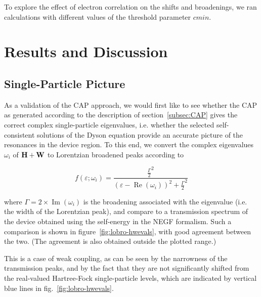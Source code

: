 To explore the effect of electron correlation on the shifts and broadenings, we
ran calculations with different values of the threshold parameter $cmin$.

\section{Results and Discussion}
\label{sec:results}

\subsection{Single-Particle Picture}
\label{subsec:SingleParticle}

As a validation of the \ac{CAP} approach, we would first like to see whether
the \ac{CAP} as generated according to the description of
section~\ref{subsec:CAP} gives the correct complex single-particle eigenvalues,
i.e. whether the selected self-consistent solutions of the Dyson equation
provide an accurate picture of the resonances in the device region. To this
end, we convert the complex eigenvalues $\omega_i$ of $\mathbf{H} + \mathbf{W}$ to
Lorentzian broadened peaks according to

\begin{equation}
	f(\varepsilon;\omega_i)
	= \frac{\frac{\Gamma}{2}^2}
	       {(\varepsilon - \operatorname{Re}(\omega_i))^2
	       + \frac{\Gamma}{2}^2}
	\label{eq:lobro}
\end{equation}

where $\Gamma = 2 \times \operatorname{Im}(\omega_i)$ is the broadening
associated with the eigenvalue (i.e. the width of the Lorentzian peak), and
compare to a transmission spectrum of the device obtained using the self-energy
in the \ac{NEGF} formalism. Such a comparison is shown in
figure~\ref{fig:lobro-hwevals}, with good agreement between the two. (The
agreement is also obtained outside the plotted range.)

This is a case of weak coupling, as can be seen by the narrowness of the
transmission peaks, and by the fact that they are not significantly shifted
from the real-valued Hartree-Fock single-particle levels, which are indicated
by vertical blue lines in fig.~\ref{fig:lobro-hwevals}. 

